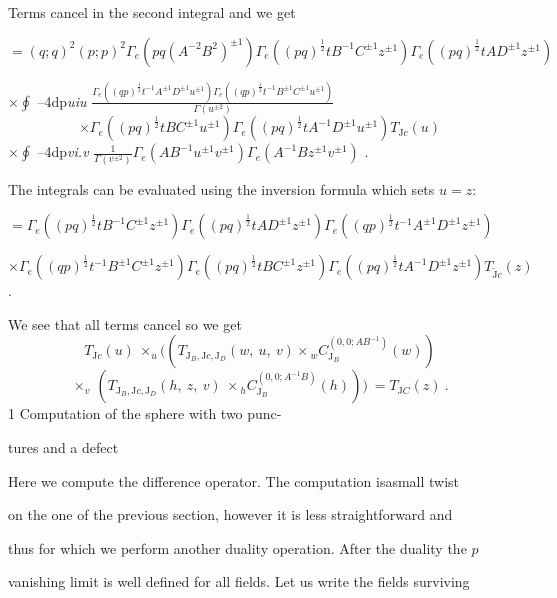 \documentclass[a4paper,12pt]{article}
\begin{document}
Terms cancel in the second integral and we get

$=(q;q)^{2}(p;p)^{2}\Gamma_{e}(pq(A^{-2}B^{2})^{\pm 1})\Gamma_{e}((pq)^{\frac{1}{2}}tB^{-1}C^{\pm 1}z^{\pm 1})\Gamma_{e}((pq)^{\frac{1}{2}}tAD^{\pm 1}z^{\pm 1})$

$\displaystyle \times\oint$ --4dp{\it uiu} $\displaystyle \frac{\Gamma_{e}((qp)^{\frac{1}{2}}t^{-1}A^{\pm 1}D^{\pm 1}u^{\pm 1})\Gamma_{e}((qp)^{\frac{1}{2}}t^{-1}B^{\pm 1}C^{\pm 1}u^{\pm 1})}{\Gamma(u^{\pm 2})}$
$$
\times\Gamma_{e}((pq)^{\frac{1}{2}}tBC^{\pm 1}u^{\pm 1})\Gamma_{e}((pq)^{\frac{1}{2}}tA^{-1}D^{\pm 1}u^{\pm 1})T_{\mathrm{J}c}(u)
$$
$\displaystyle \times\oint$ --4dp{\it vi.v} $\displaystyle \frac{1}{\Gamma(v^{\pm 2})}\Gamma_{e}(AB^{-1}u^{\pm 1}v^{\pm 1})\Gamma_{e}(A^{-1}Bz^{\pm 1}v^{\pm 1})$ .

The integrals can be evaluated using the inversion formula which sets $u=z$:

$=\Gamma_{e}((pq)^{\frac{1}{2}}tB^{-1}C^{\pm 1}z^{\pm 1})\Gamma_{e}((pq)^{\frac{1}{2}}tAD^{\pm 1}z^{\pm 1})\Gamma_{e}((qp)^{\frac{1}{2}}t^{-1}A^{\pm 1}D^{\pm 1}z^{\pm 1})$

$\times\Gamma_{e}((qp)^{\frac{1}{2}}t^{-1}B^{\pm 1}C^{\pm 1}z^{\pm 1})\Gamma_{e}((pq)^{\frac{1}{2}}tBC^{\pm 1}z^{\pm 1})\Gamma_{e}((pq)^{\frac{1}{2}}tA^{-1}D^{\pm 1}z^{\pm 1})T_{\tilde{\mathrm{J}}c}(z)$ .

We see that all terms cancel so we get
$$
T_{\mathrm{J}c}(u)\ \times_{u}((T_{\mathrm{J}_{B},\mathrm{J}c,\mathrm{J}_{D}}(w,\ u,\ v)\times {}_{w}C_{\mathrm{J}_{B}}^{(0,0;AB^{-1})}(w))
$$
$$
\times_{v}\ (T_{\mathrm{J}_{B},\mathrm{J}c,\mathrm{J}_{D}}(h,\ z,\ v)\ \times {}_{h}C_{\mathrm{J}_{B}}^{(0,0;A^{-1}B)}(h)))\ =T_{\mathrm{J}C}(z)\ .
$$
1 Computation of the sphere with two punc-

tures and a defect

Here we compute the difference operator. The computation isasmall twist

on the one of the previous section, however it is less straightforward and

thus for which we perform another duality operation. After the duality the $p$

vanishing limit is well defined for all fields. Let us write the fields surviving
\end{document}
